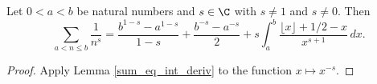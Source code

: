 \begin{lemma}
\label{ZetaSum_aux1}
\leanok
Let $0 < a < b$ be natural numbers and $s\in \C$ with $s \ne 1$ and $s \ne 0$.
  Then
  \[
  \sum_{a < n \le b} \frac{1}{n^s} =  \frac{b^{1-s} - a^{1-s}}{1-s} + \frac{b^{-s}-a^{-s}}{2}
    + s \int_a^b \frac{\lfloor x\rfloor + 1/2 - x}{x^{s+1}} \, dx.
  \]
\end{lemma}
\begin{proof}
\leanok
Apply Lemma \ref{sum_eq_int_deriv} to the function $x \mapsto x^{-s}$.
\end{proof}
